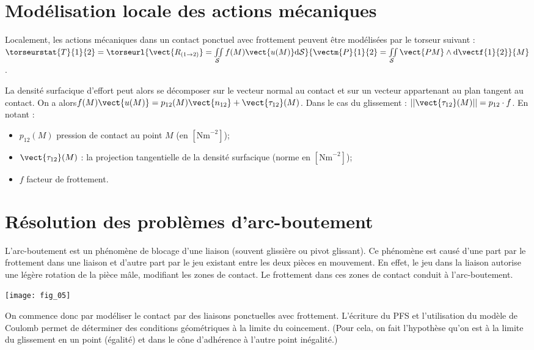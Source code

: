 \section{Modélisation locale des actions mécaniques}
\begin{defi}
Localement, les actions mécaniques dans un contact ponctuel avec frottement peuvent être modélisées par le torseur suivant :
$
\torseurstat{T}{1}{2}=
\torseurl{%
\vect{R_{(1\rightarrow 2)}} 
= \iint\limits_{\mathcal{S}} f(M) \vect{u(M)} \text{d}\mathcal{S}}{%
\vectm{P}{1}{2} = \iint\limits_{\mathcal{S}}\vect{PM}\wedge \text{d}\vectf{1}{2}}{M}
$.

La densité surfacique d'effort peut alors se décomposer sur le vecteur normal au contact et sur un vecteur appartenant au plan tangent au contact. On a alors$f(M) \vect{u(M)} = p_{12}(M)\vect{n_{12}}+\vect{\tau_{12}}(M)$. 
Dans le cas du glissement : $||\vect{\tau_{12}}(M)||=p_{12}\cdot f$.
En notant : 
\begin{itemize}
\item $p_{12}(M)$ pression de contact au point $M$ (en $\left[\text{Nm}^{-2}\right]$);
\item $\vect{\tau_{12}}(M)$ : la projection tangentielle de la densité surfacique (norme en $\left[\text{Nm}^{-2}\right]$);
\item $f$ facteur de frottement.
\end{itemize}
\end{defi}

\section{Résolution des problèmes d'arc-boutement}
L'arc-boutement est un phénomène de blocage d'une liaison (souvent glissière ou pivot glissant). Ce phénomène est causé d'une part par le frottement dans une liaison et d'autre part par le jeu existant entre les deux pièces en mouvement. En effet, le jeu dans la liaison autorise une légère rotation de la pièce mâle, modifiant les zones de contact. Le frottement dans ces zones de contact conduit à l'arc-boutement. 

\begin{center}
\texttt{[image: fig\_05]}
\end{center}

On commence donc par modéliser le contact par des liaisons ponctuelles avec frottement. L'écriture du PFS et l'utilisation du modèle de Coulomb permet de déterminer des conditions géométriques à la limite du coincement. 
(Pour cela, on fait l'hypothèse qu'on est à la limite du glissement en un point (égalité) et dans le cône d'adhérence à l'autre point inégalité.) 

